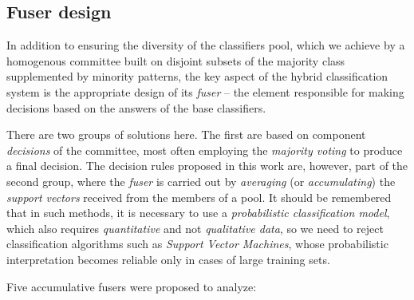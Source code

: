 \documentclass[pmlr]{jmlr}
\begin{document}
\subsection{Fuser design}

In addition to ensuring the diversity of the classifiers pool, which we achieve by a homogenous committee built on disjoint subsets of the majority class supplemented by minority patterns, the key aspect of the hybrid classification system is the appropriate design of its \emph{fuser} -- the element responsible for making decisions based on the answers of the base classifiers.

There are two groups of solutions here. The first are based on component \emph{decisions} of the committee, most often employing the \emph{majority voting} to produce a final decision. The decision rules proposed in this work are, however, part of the second group, where the \emph{fuser} is carried out by \emph{averaging} (or \emph{accumulating}) the \emph{support vectors} received from the members of a pool. It should be remembered that in such methods, it is necessary to use a \emph{probabilistic classification model}, which also requires \emph{quantitative} and not \emph{qualitative data}, so we need to reject classification algorithms such as \emph{Support Vector Machines}, whose probabilistic interpretation becomes reliable only in cases of large training sets.


Five accumulative fusers were proposed to analyze:
\end{document}
